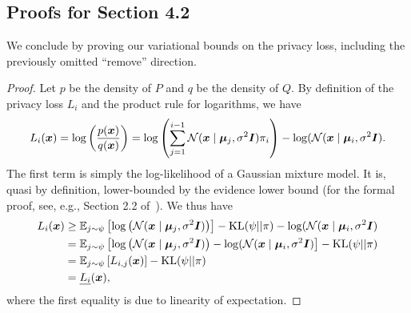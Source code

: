 \subsection{Proofs for Section 4.2}\label{appendix:proofs_variational}
We conclude by proving our variational bounds on the privacy loss, including the previously omitted ``remove'' direction.
\variationalgeneric*
\begin{proof}
    Let $p$ be the density of $P$ and $q$ be the density of $Q$.
    By definition of the privacy loss $L_i$ and the product rule for logarithms, we have
    \begin{equation*}
        L_i({\bm{x}}) = \log \left( \frac{p({\bm{x}})}{q({\bm{x}})} \right) =
        \log \left( \sum_{j=1}^{i-1} \mathcal{N}({\bm{x}} \mid {\bm{\mu}}_j, \sigma^2 {\bm{I}}) \pi_i \right)
        - \log(\mathcal{N}({\bm{x}} \mid {\bm{\mu}}_i, \sigma^2 {\bm{I}}).
    \end{equation*}
    The first term is simply the log-likelihood of a Gaussian mixture model.
    It is, quasi by definition, lower-bounded by the evidence lower bound (for the formal proof, see, e.g., Section 2.2 of~\cite{blei2017variational}).
    We thus have
    \begin{align*}
        L_i({\bm{x}})
        & \geq \mathbb{E}_{j \sim \psi}\left[\log \left( \mathcal{N}({\bm{x}} \mid {\bm{\mu}}_j, \sigma^2 {\bm{I}}) \right)\right] - \mathrm{KL}( \psi || \pi) - \log(\mathcal{N}({\bm{x}} \mid {\bm{\mu}}_i, \sigma^2 {\bm{I}})
        \\
        &
        =
         \mathbb{E}_{j \sim \psi}\left[\log \left( \mathcal{N}({\bm{x}} \mid {\bm{\mu}}_j, \sigma^2 {\bm{I}}) \right)  - \log(\mathcal{N}({\bm{x}} \mid {\bm{\mu}}_i, \sigma^2 {\bm{I}}) \right] - \mathrm{KL}( \psi || \pi)
        \\
        &
        =
         \mathbb{E}_{j \sim \psi}\left[ L_{i,j}({\bm{x}})\right] - \mathrm{KL}( \psi || \pi)
         \\
         &
         = \underline{L_i}({\bm{x}}),
    \end{align*}
    where the first equality is due to linearity of expectation.
\end{proof}


